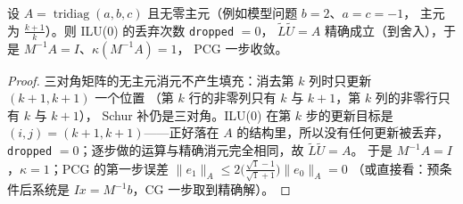 \begin{theorem}
\label{thm:ilu-tridiag}
设 $A=\operatorname{tridiag}(a,b,c)$ 且无零主元（例如模型问题 $b=2$、$a=c=-1$，
主元为 $\frac{k+1}{k}$）。则 ILU(0) 的丢弃次数 \texttt{dropped} $=0$，
$\tilde L\tilde U=A$ 精确成立（到舍入），于是 $M^{-1}A=I$、$\kappa(M^{-1}A)=1$，
PCG 一步收敛。
\end{theorem}

\begin{proof}
三对角矩阵的无主元消元不产生填充：消去第 $k$ 列时只更新 $(k+1,k+1)$ 一个位置
（第 $k$ 行的非零列只有 $k$ 与 $k+1$，第 $k$ 列的非零行只有 $k$ 与 $k+1$），
Schur 补仍是三对角。ILU(0) 在第 $k$ 步的更新目标是
$(i,j)=(k+1,k+1)$——正好落在 $A$ 的结构里，所以没有任何更新被丢弃，
\texttt{dropped} $=0$；逐步做的运算与精确消元完全相同，故 $\tilde L\tilde U=A$。
于是 $M^{-1}A=I$，$\kappa=1$；PCG 的第一步误差
$\|e_1\|_A\le2\bigl(\frac{\sqrt1-1}{\sqrt1+1}\bigr)\|e_0\|_A=0$
（或直接看：预条件后系统是 $Ix=M^{-1}b$，CG 一步取到精确解）。
\end{proof}


